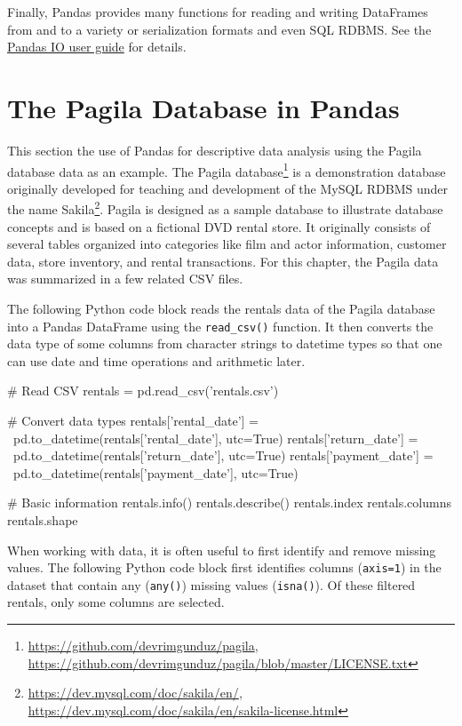 Finally, Pandas provides many functions for reading and writing DataFrames from and to a variety or serialization formats and even SQL RDBMS. See the \href{https://pandas.pydata.org/docs/user_guide/io.html#}{Pandas IO user guide} for details. 

\section{The Pagila Database in Pandas}

This section the use of Pandas for descriptive data analysis using the Pagila database data as an example. The Pagila database\footnote{\url{https://github.com/devrimgunduz/pagila}, \\
\url{https://github.com/devrimgunduz/pagila/blob/master/LICENSE.txt}} is a demonstration database originally developed for teaching and development of the MySQL RDBMS under the name Sakila\footnote{\url{https://dev.mysql.com/doc/sakila/en/}, \\
\url{https://dev.mysql.com/doc/sakila/en/sakila-license.html}}. Pagila is designed as a sample database to illustrate database concepts and is based on a fictional DVD rental store. It originally consists of several tables organized into categories like film and actor information, customer data, store inventory, and rental transactions. For this chapter, the Pagila data was summarized in a few related CSV files. 

The following Python code block reads the rentals data of the Pagila database into a Pandas DataFrame using the \texttt{read\_csv()} function. It then converts the data type of some columns from character strings to datetime types so that one can use date and time operations and arithmetic later.

\begin{samepage}
\begin{pythoncode}
# Read CSV
rentals = pd.read_csv('rentals.csv')

# Convert data types
rentals['rental_date'] = \
    pd.to_datetime(rentals['rental_date'], utc=True)
rentals['return_date'] = \
    pd.to_datetime(rentals['return_date'], utc=True)
rentals['payment_date'] = \
    pd.to_datetime(rentals['payment_date'], utc=True)

# Basic information
rentals.info()
rentals.describe()
rentals.index
rentals.columns
rentals.shape
\end{pythoncode}
\end{samepage}

When working with data, it is often useful to first identify and remove missing values. The following Python code block first identifies columns (\texttt{axis=1}) in the dataset that contain any (\texttt{any()}) missing values (\texttt{isna()}). Of these filtered rentals, only some columns are selected.

